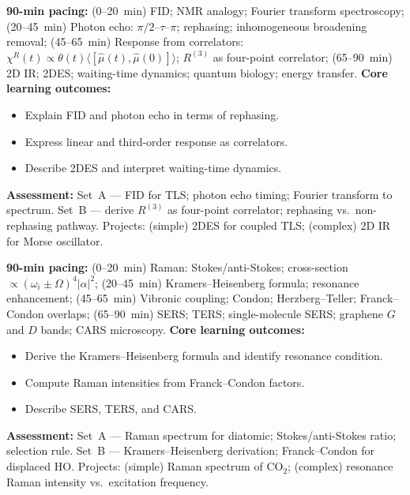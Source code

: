 \documentclass[11pt,a4paper]{article}
\begin{document}
\medskip

\begin{tcolorbox}[modulebox, title={Module~II.6 / L09: Time-Domain Spectroscopy}]
\textbf{90-min pacing:} (0--20~min) FID; NMR analogy; Fourier transform spectroscopy; (20--45~min) Photon echo: $\pi/2$--$\tau$--$\pi$; rephasing; inhomogeneous broadening removal; (45--65~min) Response from correlators: $\chi^R(t)\propto\theta(t)\langle[\hat\mu(t),\hat\mu(0)]\rangle$; $R^{(3)}$ as four-point correlator; (65--90~min) 2D IR; 2DES; waiting-time dynamics; quantum biology; energy transfer.
\medskip\textbf{Core learning outcomes:}
\begin{itemize}[leftmargin=1.4em,topsep=2pt,itemsep=1pt]
  \item Explain FID and photon echo in terms of rephasing.
  \item Express linear and third-order response as correlators.
  \item Describe 2DES and interpret waiting-time dynamics.
\end{itemize}
\medskip\textbf{Assessment:}
Set~A --- FID for TLS; photon echo timing; Fourier transform to spectrum.
Set~B --- derive $R^{(3)}$ as four-point correlator; rephasing vs.\ non-rephasing pathway.
Projects: (simple) 2DES for coupled TLS; (complex) 2D IR for Morse oscillator.
\end{tcolorbox}

\medskip

\begin{tcolorbox}[modulebox, title={Module~II.6 / L10: Raman and Resonance Raman Spectroscopy}]
\textbf{90-min pacing:} (0--20~min) Raman: Stokes/anti-Stokes; cross-section $\propto(\omega_i\pm\Omega)^4|\alpha|^2$; (20--45~min) Kramers--Heisenberg formula; resonance enhancement; (45--65~min) Vibronic coupling; Condon; Herzberg--Teller; Franck--Condon overlaps; (65--90~min) SERS; TERS; single-molecule SERS; graphene $G$ and $D$ bands; CARS microscopy.
\medskip\textbf{Core learning outcomes:}
\begin{itemize}[leftmargin=1.4em,topsep=2pt,itemsep=1pt]
  \item Derive the Kramers--Heisenberg formula and identify resonance condition.
  \item Compute Raman intensities from Franck--Condon factors.
  \item Describe SERS, TERS, and CARS.
\end{itemize}
\medskip\textbf{Assessment:}
Set~A --- Raman spectrum for diatomic; Stokes/anti-Stokes ratio; selection rule.
Set~B --- Kramers--Heisenberg derivation; Franck--Condon for displaced HO.
Projects: (simple) Raman spectrum of CO$_2$; (complex) resonance Raman intensity vs.\ excitation frequency.
\end{tcolorbox}
\end{document}
